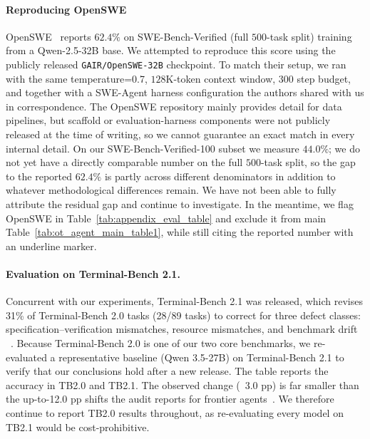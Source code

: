 \documentclass{llmxive}
\begin{document}
\paragraph{Reproducing OpenSWE}
\label{app:eval_reprod_openswe}
OpenSWE~\citep{fu2026davincienvopensweenvironment} reports $62.4\%$ on SWE-Bench-Verified (full $500$-task split) training from a Qwen-2.5-32B base. We attempted to reproduce this score using the publicly released \texttt{GAIR/OpenSWE-32B} checkpoint. To match their setup, we ran with the same temperature=0.7, $128\text{K}$-token context window, 300 step budget, and together with a SWE-Agent harness configuration the authors shared with us in correspondence. The OpenSWE repository mainly provides detail for data pipelines, but scaffold or evaluation-harness components were not publicly released at the time of writing, so we cannot guarantee an exact match in every internal detail. On our SWE-Bench-Verified-100 subset we measure $44.0\%$; we do not yet have a directly comparable number on the full $500$-task split, so the gap to the reported $62.4\%$ is partly across different denominators in addition to whatever methodological differences remain. We have not been able to fully attribute the residual gap and continue to investigate. In the meantime, we flag OpenSWE in Table~\ref{tab:appendix_eval_table} and exclude it from main Table~\ref{tab:ot_agent_main_table1}, while still citing the reported number with an underline marker.



\paragraph{Evaluation on Terminal-Bench 2.1.}
Concurrent with our experiments, Terminal-Bench 2.1 was released, which revises 31\% of Terminal-Bench 2.0 tasks (28/89 tasks) to correct for three defect classes: specification--verification mismatches, resource mismatches, and benchmark drift ~\citep{tb21audit}. Because Terminal-Bench 2.0 is one of our two core benchmarks, we re-evaluated a representative baseline (Qwen 3.5-27B) on Terminal-Bench 2.1 to verify that our conclusions hold after a new release.  The table  reports the accuracy in TB2.0 and TB2.1.  The observed change (~3.0 pp) is far smaller than the up-to-12.0 pp shifts the audit reports for frontier agents~\citep{tb21audit}. We therefore continue to report TB2.0 results throughout, as re-evaluating every model on TB2.1 would be cost-prohibitive.
\end{document}
